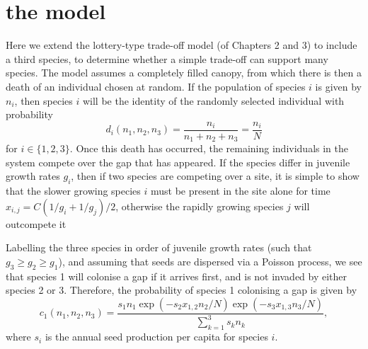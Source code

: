 \documentclass[preprint,10pt,reqno]{amsart}
\begin{document}
\section{the model}
Here we extend the lottery-type trade-off model (of Chapters 2 and 3) to include a third species, to determine whether a simple trade-off can support many species. The model assumes a completely filled canopy, from which there is then a death of an individual chosen at random. If the population of species $i$ is given by $n_i$, then species $i$ will be the identity of the randomly selected individual with probability
\begin{equation}
\label{d}
d_i(n_1,n_2,n_3)=\frac{n_i}{n_1+n_2+n_3}=\frac{n_i}{N} \end{equation}
for $i \in \{1,2,3\}$. Once this death has occurred, the remaining individuals in the system compete over the gap that has appeared. If the species differ in juvenile growth rates $g_i$, then if two species are competing over a site, it is simple to show that the slower growing species $i$ must be present in the site alone for time $x_{i,j}=C(1/g_i +1/g_j)/2$, otherwise the rapidly growing species $j$ will outcompete it

Labelling the three species in order of juvenile growth rates (such that $g_3 \geq g_2\geq g_1$), and assuming that seeds are dispersed via a Poisson process, we see that species 1 will colonise a gap if it arrives first, and is not invaded by either species 2 or 3. Therefore, the probability of species 1 colonising a gap is given by
\begin{equation}
\label{c1}
c_1(n_1,n_2,n_3)=\frac{s_1 n_1 \exp(-s_2x_{1,2}n_2/N)\exp(-s_3x_{1,3}n_3/N)}{\sum_{k=1}^3 s_k n_k},\end{equation}
where $s_i$ is the annual seed production per capita for species $i$.
\end{document}

